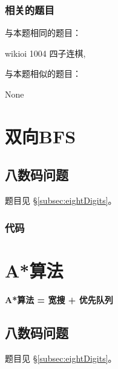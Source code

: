 \subsubsection{相关的题目}
与本题相同的题目：
\begindot
\item  wikioi 1004 四子连棋, 
\myenddot

与本题相似的题目：
\begindot
\item  None
\myenddot


\section{双向BFS} %
\label{sec:biBFS}


\subsection{八数码问题}
题目见 \S \ref{subsec:eightDigits}。

\subsubsection{代码}

\begin{Codex}[label=eight_digits_bibfs.c]

\end{Codex}


\section{A*算法} %
\label{sec:astar}

\textbf{A*算法 = 宽搜 + 优先队列}

\subsection{八数码问题}
题目见 \S \ref{subsec:eightDigits}。

